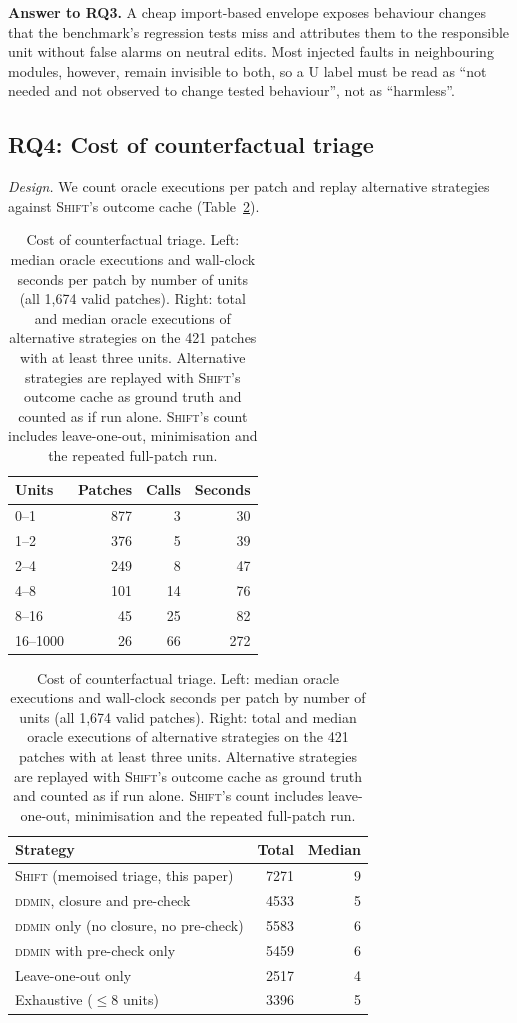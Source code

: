 \documentclass[a4paper,fleqn]{cas-sc}
\newcommand{\tool}{\textsc{Shift}}
\newcommand{\lab}[1]{\textsf{#1}}
\begin{document}
\begin{answerbox}\textbf{Answer to RQ3.} A cheap import-based envelope exposes behaviour changes that the benchmark's regression tests miss and attributes them to the responsible unit without false alarms on neutral edits. Most injected faults in neighbouring modules, however, remain invisible to both, so a \lab{U} label must be read as ``not needed and not observed to change tested behaviour'', not as ``harmless''.\end{answerbox}


\subsection{RQ4: Cost of counterfactual triage}\label{sec:rq4}
\emph{Design.} We count oracle executions per patch and replay alternative strategies against \tool{}'s outcome cache (Table~\ref{tab:cost}).

\begin{table}[t]
\caption{Cost of counterfactual triage. Left: median oracle executions and wall-clock seconds per patch by number of units (all 1{,}674 valid patches). Right: total and median oracle executions of alternative strategies on the 421 patches with at least three units. Alternative strategies are replayed with \tool{}'s outcome cache as ground truth and counted as if run alone. \tool{}'s count includes leave-one-out, minimisation and the repeated full-patch run.}
\label{tab:cost}
\centering\footnotesize
\begin{tabular}{lrrr}
\toprule
Units & Patches & Calls & Seconds \\
\midrule
0--1 & 877 & 3 & 30 \\
1--2 & 376 & 5 & 39 \\
2--4 & 249 & 8 & 47 \\
4--8 & 101 & 14 & 76 \\
8--16 & 45 & 25 & 82 \\
16--1000 & 26 & 66 & 272 \\
\bottomrule
\end{tabular}\hfill
\begin{tabular}{lrr}
\toprule
Strategy & Total & Median \\
\midrule
\tool{} (memoised triage, this paper) & 7271 & 9 \\
\textsc{ddmin}, closure and pre-check & 4533 & 5 \\
\textsc{ddmin} only (no closure, no pre-check) & 5583 & 6 \\
\textsc{ddmin} with pre-check only & 5459 & 6 \\
Leave-one-out only & 2517 & 4 \\
Exhaustive ($\leq$8 units) & 3396 & 5 \\
\bottomrule
\end{tabular}
\end{table}
\end{document}
